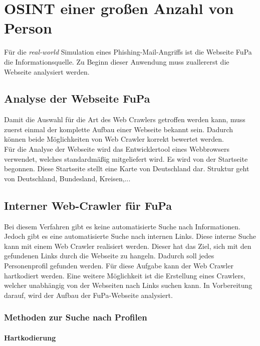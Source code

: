 
\chapter{OSINT einer großen Anzahl von Person}  %
\label{cha:Informationsbeschaffung einer grossen Anzahl von Person} %
Für die \textit{real-world} Simulation eines Phishing-Mail-Angriffs ist die Webseite FuPa die Informationsquelle. Zu Beginn dieser Anwendung muss zuallererst die Webseite analysiert werden.

\section{Analyse der Webseite FuPa}
Damit die Auswahl für die Art des Web Crawlers getroffen werden kann, muss zuerst einmal der komplette Aufbau einer Webseite bekannt sein. Dadurch können beide Möglichkeiten von Web Crawler korrekt bewertet werden.\\
Für die Analyse der Webseite wird das Entwicklertool eines Webbrowsers verwendet, welches standardmäßig mitgeliefert wird. %
Es wird von der Startseite begonnen. Diese Startseite stellt eine Karte von Deutschland dar. Struktur geht von Deutschland, Bundesland, Kreisen,...

\section{Interner Web-Crawler für FuPa}
Bei diesem Verfahren gibt es keine automatisierte Suche nach Informationen. Jedoch gibt es eine automatisierte Suche nach internen Links. Diese interne Suche kann mit einem Web Crawler realisiert werden. Dieser hat das Ziel, sich mit den gefundenen Links durch die Webseite zu hangeln. Dadurch soll jedes Personenprofil gefunden werden. Für diese Aufgabe kann der Web Crawler hartkodiert werden. Eine weitere Möglichkeit ist die Erstellung eines Crawlers, welcher unabhängig von der Webseiten nach Links suchen kann. In Vorbereitung darauf, wird der Aufbau der FuPa-Webseite analysiert.\\
	\subsection{Methoden zur Suche nach Profilen}
		\subsubsection{Hartkodierung}
